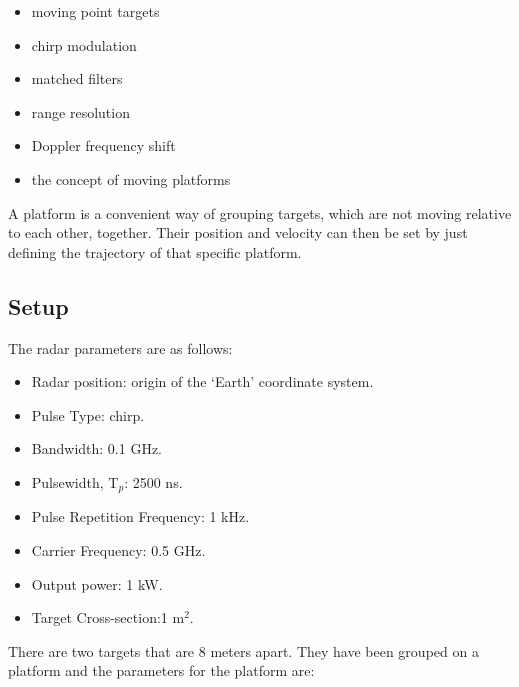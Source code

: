 \documentclass[thmsa,a4paper,ukenglish]{report}
\begin{document}
\begin{itemize}
\item  moving point targets

\item  chirp modulation

\item  matched filters

\item  range resolution

\item  Doppler frequency shift

\item  the concept of moving platforms
\end{itemize}

A platform is a convenient way of grouping targets, which are not moving
relative to each other, together. Their position and velocity can then be
set by just defining the trajectory of that specific platform.

\subsection{Setup}

\smallskip \smallskip The radar parameters are as follows:

\begin{itemize}
\begin{itemize}
\item  Radar position: origin of the `Earth' coordinate system.

\item  \smallskip Pulse Type: chirp.

\item  Bandwidth: 0.1 GHz.

\item  \smallskip Pulsewidth, T$_{p}$: 2500 ns.

\item  Pulse Repetition Frequency: 1 kHz.

\item  Carrier Frequency: 0.5 GHz.

\item  Output power: 1 kW.

\item  Target Cross-section:1 m$^{2}$.
\end{itemize}
\end{itemize}

\smallskip There are two targets that are 8 meters apart. They have been
grouped on a platform and the parameters for the platform are:
\end{document}
